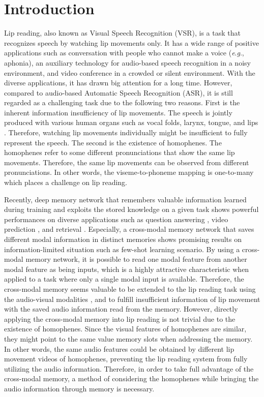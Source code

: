 \documentclass[letterpaper]{article} \usepackage{aaai22}  \usepackage{times}  \usepackage{helvet}  \usepackage{courier}  \usepackage[hyphens]{url}  \usepackage{graphicx} \urlstyle{rm} \def\UrlFont{\rm}  \usepackage{natbib}  \usepackage{caption} \DeclareCaptionStyle{ruled}{labelfont=normalfont,labelsep=colon,strut=off} \frenchspacing  \setlength{\pdfpagewidth}{8.5in}  \setlength{\pdfpageheight}{11in}  \usepackage{algorithm}
\newcommand{\eg}{\textit{e}.\textit{g}.}
\begin{document}
\section{Introduction}
Lip reading, also known as Visual Speech Recognition (VSR), is a task that recognizes speech by watching lip movements only. It has a wide range of positive applications such as conversation with people who cannot make a voice (\eg, aphonia), an auxiliary technology for audio-based speech recognition in a noisy environment, and video conference in a crowded or silent environment. With the diverse applications, it has drawn big attention for a long time. However, compared to audio-based Automatic Speech Recognition (ASR), it is still regarded as a challenging task due to the following two reasons. First is the inherent information insufficiency of lip movements. The speech is jointly produced with various human organs such as vocal folds, larynx, tongue, and lips \cite{sataloff1992human}. Therefore, watching lip movements individually might be insufficient to fully represent the speech. The second is the existence of homophenes. The homophenes refer to some different pronunciations that show the same lip movements. Therefore, the same lip movements can be observed from different pronunciations. In other words, the viseme-to-phoneme mapping is one-to-many which places a challenge on lip reading. 

Recently, deep memory network \cite{weston2014memory,sukhbaatar2015end} that remembers valuable information learned during training and exploits the stored knowledge on a given task shows powerful performances on diverse applications such as question answering \cite{miller2016keyvalue}, video prediction \cite{lee2021videopredictionmem}, and retrieval \cite{song2018memoryforcrossmodalretrieval,huang2019acmmforfew-shotmatching}. Especially, a cross-modal memory network \cite{zhang2020fewshotcrossmodalmem} that saves different modal information in distinct memories shows promising results on information-limited situation such as few-shot learning scenario. By using a cross-modal memory network, it is possible to read one modal feature from another modal feature as being inputs, which is a highly attractive characteristic when applied to a task where only a single modal input is available. Therefore, the cross-modal memory seems valuable to be extended to the lip reading task using the audio-visual modalities \cite{kim2021visualaudiomem}, and to fulfill insufficient information of lip movement with the saved audio information read from the memory. However, directly applying the cross-modal memory into lip reading is not trivial due to the existence of homophenes. Since the visual features of homophenes are similar, they might point to the same value memory slots when addressing the memory. In other words, the same audio features could be obtained by different lip movement videos of homophenes, preventing the lip reading system from fully utilizing the audio information. Therefore, in order to take full advantage of the cross-modal memory, a method of considering the homophenes while bringing the audio information through memory is necessary.
\end{document}

